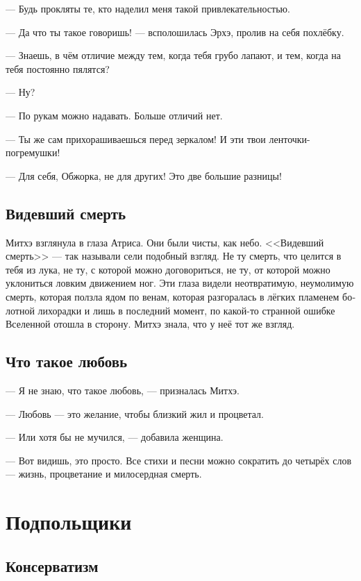 \documentclass[a4paper,12pt,fleqn]{book}\usepackage{polyglossia}\setdefaultlanguage[babelshorthands=true]{russian}\setotherlanguage{english}\defaultfontfeatures{Ligatures=TeX,Mapping=tex-text}\usepackage{xcolor}\newcommand{\ml}[3]{#2}
\begin{document}
{--- Будь прокляты те, кто наделил меня такой привлекательностью.

--- Да что ты такое говоришь! --- всполошилась Эрхэ, пролив на себя похлёбку.

--- Знаешь, в чём отличие между тем, когда тебя грубо лапают, и тем, когда на тебя постоянно пялятся?

--- Ну?

--- По рукам можно надавать.
Больше отличий нет.

--- Ты же сам прихорашиваешься перед зеркалом!
И эти твои ленточки-погремушки!

--- Для себя, Обжорка, не для других!
Это две большие разницы!

\section{Видевший смерть}

Митхэ взглянула в глаза Атриса.
Они были чисты, как небо.
<<Видевший смерть>> --- так называли сели подобный взгляд.
Не ту смерть, что целится в тебя из лука, не ту, с которой можно договориться, не ту, от которой можно уклониться ловким движением ног.
Эти глаза видели неотвратимую, неумолимую смерть, которая ползла ядом по венам, которая разгоралась в лёгких пламенем болотной лихорадки и лишь в последний момент, по какой-то странной ошибке Вселенной отошла в сторону.
Митхэ знала, что у неё тот же взгляд.

\section{Что такое любовь}

--- Я не знаю, что такое любовь, --- призналась Митхэ.

--- Любовь --- это желание, чтобы близкий жил и процветал.

--- Или хотя бы не мучился, --- добавила женщина.

--- Вот видишь, это просто.
Все стихи и песни можно сократить до четырёх слов --- жизнь, процветание и милосердная смерть.

\chapter{Подпольщики}

\section{Консерватизм}

}
\end{document}
